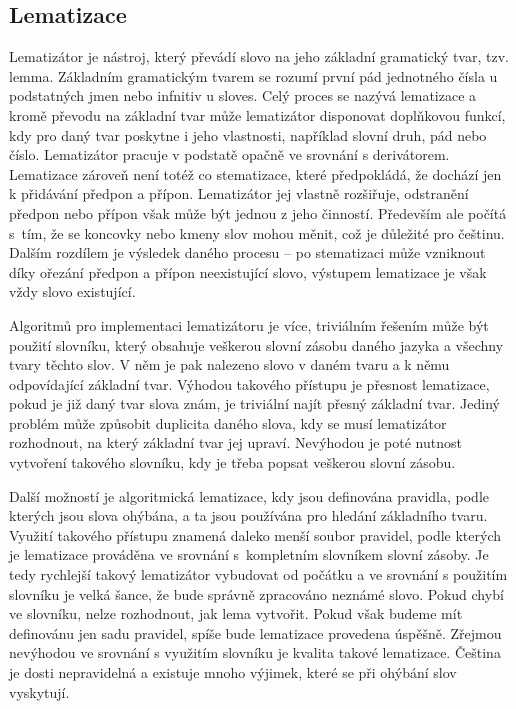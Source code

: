 \documentclass[FM,DP]{tulthesis}
\begin{document}
\subsection{Lematizace}

Lematizátor je nástroj, který převádí slovo na jeho základní gramatický tvar, tzv. lemma.
Základním gramatickým tvarem se rozumí první pád jednotného čísla u podstatných jmen nebo infnitiv 
u sloves. Celý proces se nazývá lematizace a kromě převodu na základní tvar může lematizátor
disponovat doplňkovou funkcí, kdy pro daný tvar poskytne i jeho vlastnosti, například 
slovní druh, pád nebo číslo. Lematizátor pracuje v podstatě opačně ve srovnání s derivátorem. 
Lematizace zároveň není totéž co stematizace, které předpokládá, že dochází 
jen k přidávání předpon a přípon. Lematizátor jej vlastně rozšiřuje, odstranění
předpon nebo přípon však může být jednou z jeho činností. Především ale počítá s~tím, 
že se koncovky nebo kmeny slov mohou měnit, což je důležité pro češtinu.
Dalším rozdílem je výsledek daného procesu -- po stematizaci může vzniknout díky ořezání
předpon a přípon neexistující slovo, výstupem lematizace je však vždy slovo existující.

Algoritmů pro implementaci lematizátoru je více, triviálním řešením může být použití
slovníku, který obsahuje veškerou slovní zásobu daného jazyka a všechny tvary těchto
slov. V něm je pak nalezeno slovo v daném tvaru a k němu odpovídající základní tvar.
Výhodou takového přístupu je přesnost lematizace, pokud je již daný tvar slova znám, 
je triviální najít přesný základní tvar. Jediný problém může způsobit duplicita daného 
slova, kdy se musí lematizátor rozhodnout, na který základní tvar jej upraví. Nevýhodou
je poté nutnost vytvoření takového slovníku, kdy je třeba popsat veškerou slovní zásobu.

Další možností je algoritmická lematizace, kdy jsou definována pravidla, podle kterých jsou
slova ohýbána, a ta jsou používána pro hledání základního tvaru. Využití takového přístupu
znamená daleko menší soubor pravidel, podle kterých je lematizace prováděna ve srovnání 
s~kompletním slovníkem slovní zásoby. Je tedy rychlejší takový lematizátor vybudovat
od počátku a ve srovnání s použitím slovníku je velká šance, že bude správně zpracováno
neznámé slovo. Pokud chybí ve slovníku, nelze rozhodnout, jak lema vytvořit. Pokud
však budeme mít definovánu jen sadu pravidel, spíše bude lematizace provedena úspěšně.
Zřejmou nevýhodou ve srovnání s využitím slovníku je kvalita takové lematizace. 
Čeština je dosti nepravidelná a existuje mnoho výjimek, které se při ohýbání slov vyskytují.
\end{document}
